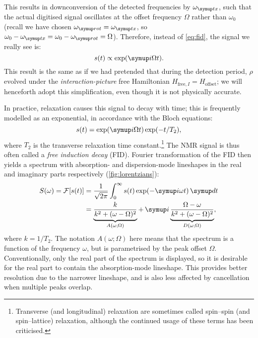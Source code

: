 This results in downconversion of the detected frequencies by $\omegatx$, such that the actual digitised signal oscillates at the offset frequency $\Omega$ rather than $\omega_0$ (recall we have chosen $\omegarot = \omegatx$, so $\omega_0 - \omegatx = \omega_0 - \omegarot = \Omega$).
Therefore, instead of \cref{eq:fid}, the signal we really see is:
\begin{equation}
    \label{eq:fid_reduced}
    s(t) \propto \exp(\mi \Omega t).
\end{equation}
This result is the same as if we had pretended that during the detection period, $\rho$ evolved under the \textit{interaction-picture} free Hamiltonian $H_{\text{free},I} = H_\text{offset}$; we will henceforth adopt this simplification, even though it is not physically accurate.

In practice, relaxation causes this signal to decay with time; this is frequently modelled as an exponential, in accordance with the Bloch equations\autocite{Bloch1946PR}:
\begin{equation}
    \label{eq:fid_with_relaxation}
    s(t) = \exp(\mi\Omega t)\exp(-t/T_2),
\end{equation}
where $T_2$ is the transverse relaxation time constant.\footnote{Transverse (and longitudinal) relaxation are sometimes called spin--spin (and spin--lattice) relaxation, although the continued usage of these terms has been criticised\autocite{Levitt2008,Keeler2010,Gupta2021JPCL}.}
The NMR signal is thus often called a \textit{free induction decay} (FID).
Fourier transformation of the FID then yields a spectrum with absorption- and dispersion-mode lineshapes in the real and imaginary parts respectively (\cref{fig:lorentzians}):
\begin{align}
    \label{eq:lorentzian}
    S(\omega) = \mathcal{F}[s(t)]
    &= \frac{1}{\sqrt{2\pi}}\int_0^\infty s(t) \exp(-\mi \omega t) \,\md t \notag \\
    &=
    \underbrace{\frac{k}{k^2 + (\omega - \Omega)^2}}_{A(\omega; \Omega)}
    +\, \mi\underbrace{\frac{\Omega - \omega}{k^2 + (\omega - \Omega)^2}}_{D(\omega; \Omega)},
\end{align}
where $k = 1/T_2$.
The notation $A(\omega; \Omega)$ here means that the spectrum is a function of the frequency $\omega$, but is parametrised by the peak offset $\Omega$.
Conventionally, only the real part of the spectrum is displayed, so it is desirable for the real part to contain the absorption-mode lineshape.
This provides better resolution due to the narrower lineshape, and is also less affected by cancellation when multiple peaks overlap.

